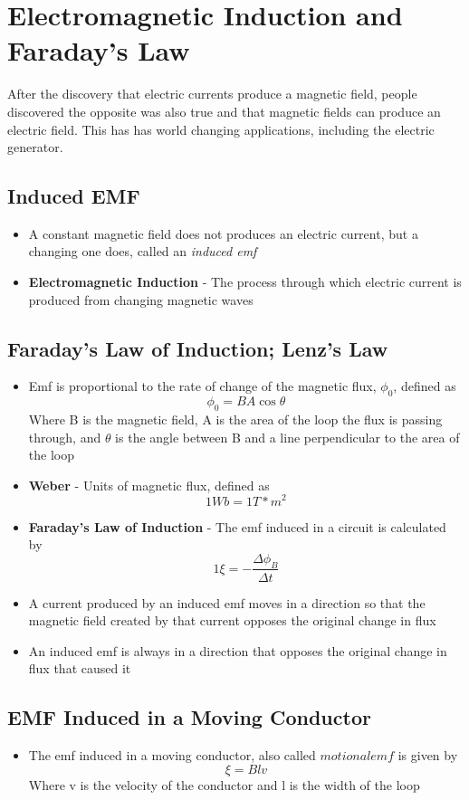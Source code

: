 \section{Electromagnetic Induction and Faraday's Law}
After the discovery that electric currents produce a magnetic field, people discovered the opposite was also true and that magnetic fields can produce an electric field. This has has world changing applications, including the electric generator.

\subsection{Induced EMF}
\begin{itemize}
    \item A constant magnetic field does not produces an electric current, but a changing one does, called an \emph{induced emf}
    \item \textbf{Electromagnetic Induction} - The process through which electric current is produced from changing magnetic waves
\end{itemize}

\subsection{Faraday's Law of Induction; Lenz's Law}
\begin{itemize}
    \item Emf is proportional to the rate of change of the magnetic flux, \(\phi_0\), defined as \[\phi_0=BA\cos\theta\] Where B is the magnetic field, A is the area of the loop the flux is passing through, and \(\theta\) is the angle between B and a line perpendicular to the area of the loop
    \item \textbf{Weber} - Units of magnetic flux, defined as \[1Wb=1T*m^2\] 
    \item \textbf{Faraday's Law of Induction} - The emf induced in a circuit is calculated by \[1\xi=-\frac{\Delta\phi_B}{\Delta t}\]
    \item A current produced by an induced emf moves in a direction so that the magnetic field created by that current opposes the original change in flux
    \item An induced emf is always in a direction that opposes the original change in flux that caused it 
\end{itemize}

\subsection{EMF Induced in a Moving Conductor}
\begin{itemize}
    \item The emf induced in a moving conductor, also called \(motional emf\) is given by \[\xi=Blv\] Where v is the velocity of the conductor and l is the width of the loop
\end{itemize}

